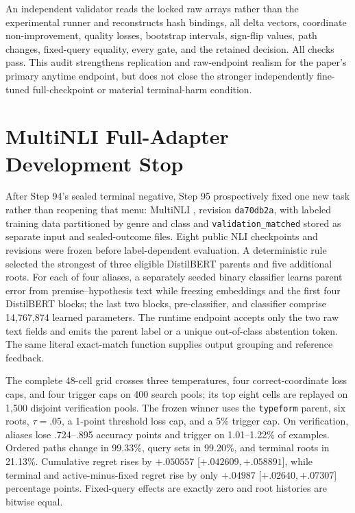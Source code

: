 An independent validator reads the locked raw arrays rather than the experimental runner and reconstructs hash bindings, all delta vectors, coordinate non-improvement, quality losses, bootstrap intervals, sign-flip values, path changes, fixed-query equality, every gate, and the retained decision. All checks pass. This audit strengthens replication and raw-endpoint realism for the paper's primary anytime endpoint, but does not close the stronger independently fine-tuned full-checkpoint or material terminal-harm condition.

\section{MultiNLI Full-Adapter Development Stop}
\label{app:step95}

After Step 94's sealed terminal negative, Step 95 prospectively fixed one new task rather than reopening that menu: MultiNLI \citep{williams2018multinli}, revision \texttt{da70db2a}, with labeled training data partitioned by genre and class and \texttt{validation\_matched} stored as separate input and sealed-outcome files. Eight public NLI checkpoints and revisions were frozen before label-dependent evaluation. A deterministic rule selected the strongest of three eligible DistilBERT parents and five additional roots. For each of four aliases, a separately seeded binary classifier learns parent error from premise--hypothesis text while freezing embeddings and the first four DistilBERT blocks; the last two blocks, pre-classifier, and classifier comprise 14,767,874 learned parameters. The runtime endpoint accepts only the two raw text fields and emits the parent label or a unique out-of-class abstention token. The same literal exact-match function supplies output grouping and reference feedback.

The complete 48-cell grid crosses three temperatures, four correct-coordinate loss caps, and four trigger caps on 400 search pools; its top eight cells are replayed on 1,500 disjoint verification pools. The frozen winner uses the \texttt{typeform} parent, six roots, $\tau=.05$, a 1-point threshold loss cap, and a 5\% trigger cap. On verification, aliases lose .724--.895 accuracy points and trigger on 1.01--1.22\% of examples. Ordered paths change in 99.33\%, query sets in 99.20\%, and terminal roots in 21.13\%. Cumulative regret rises by $+.050557$ [$+.042609,+.058891$], while terminal and active-minus-fixed regret rise by only $+.04987$ [$+.02640,+.07307$] percentage points. Fixed-query effects are exactly zero and root histories are bitwise equal.

